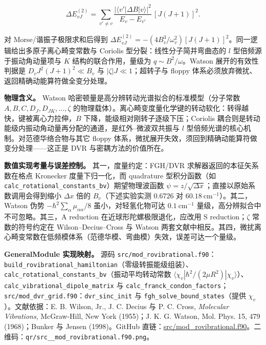 \documentclass[
]{ctexbook}
\begin{document}
\[\Delta E_{vJ}^{(2)}=\sum_{v'\ne v}\frac{|\langle v'|\Delta B|v\rangle|^{2}}{E_v-E_{v'}}\,[J(J+1)]^{2}.\]

对 Morse/谐振子极限求和后得到
\(\Delta E_{vJ}^{(2)}=-\left(4B_v^{3}/\omega_v^{2}\right)[J(J+1)]^{2}\)。同一逻辑给出多原子离心畸变常数与
Coriolis 型分裂：线性分子简并弯曲态的 \(l\) 型倍频源于振动角动量项与
\(K\) 结构的联合作用，量级为 \(q\sim B^{2}/\omega\)。Watson
展开的有效性判据是 \(D_v J^{2}(J+1)^{2}\ll B_v\) 与
\(|\zeta|J\ll1\)；超转子与 floppy
体系必须放弃微扰、返回精确动能算符做全变分处理。

\textbf{物理含义。} Watson
哈密顿量是高分辨转动光谱拟合的标准模型（分子常数
\(A,B,C,D_J,D_{JK},\ldots,\zeta\)
的物理载体）。离心畸变度量化学键的转动软化：转得越快，键被离心力拉伸，\(B\)
下降，能级相对刚转子逐级下压；Coriolis
耦合则是转动能级内振动角动量再分配的通道，是红外--微波双共振与 \(l\)
型倍频光谱的核心机制。对范德华络合物与其它 floppy
体系，微扰展开失效，须回到精确动能算符做变分处理------这正是 DVR
与密耦方法的价值所在。

\textbf{数值实现考量与误差控制。} 其一，度量约定：FGH/DVR
求解器返回的本征矢系数在格点 Kronecker 度量下归一化，而 quadrature
型积分函数（如 \texttt{calc\_rotational\_constants\_bv}）期望物理波函数
\(\psi=z/\sqrt{\Delta x}\)；直接以原始系数调用会得到缩小 \(\Delta x\)
倍的 \(B_v\)（下述实验实测 \(0.6726\) 对
\(60.18\ \mathrm{cm^{-1}}\)）。其二，Watson 伪势
\(-\hbar^{2}\sum_\alpha\mu_{\alpha\alpha}/8\) 虽小，对轻氢化物可达
\(0.1\ \mathrm{cm^{-1}}\) 量级，高分辨拟合中不可忽略。其三，A reduction
在近球形陀螺极限退化，应改用 S reduction；\(\zeta\) 常数的符号约定在
Wilson--Decius--Cross 与 Watson
两套文献中相反。其四，微扰离心畸变常数在低频模体系（范德华模、弯曲模）失效，误差可达一个量级。

\textbf{GeneralModule 实现映射。} 源码
\texttt{src/mod\_rovibrational.f90}：\texttt{build\_rovibrational\_hamiltonian}（零级转振能级组装）、\texttt{calc\_rotational\_constants\_bv}（振动平均转动常数
\(\langle\chi_v|\hbar^{2}/(2\mu R^{2})|\chi_v\rangle\)）、\texttt{calc\_vibrational\_dipole\_matrix}
与
\texttt{calc\_franck\_condon\_factors}；\texttt{src/mod\_dvr\_grid.f90}：\texttt{dvr\_sinc\_init}
与 \texttt{fgh\_solve\_bound\_states}（提供 \(\chi_v\)）。文献依据：E.
B. Wilson, Jr., J. C. Decius 与 P. C. Cross, \emph{Molecular
Vibrations}, McGraw-Hill, New York (1955)；J. K. G. Watson, Mol. Phys.
15, 479 (1968)；Bunker 与 Jensen (1998)。GitHub
直链：\href{https://github.com/l1Ha/QuantumGeneralModule/blob/main/src/mod_rovibrational.f90}{src/mod\_rovibrational.f90}。二维码：\texttt{qr/src\_\_mod\_rovibrational.f90.png}。
\end{document}

